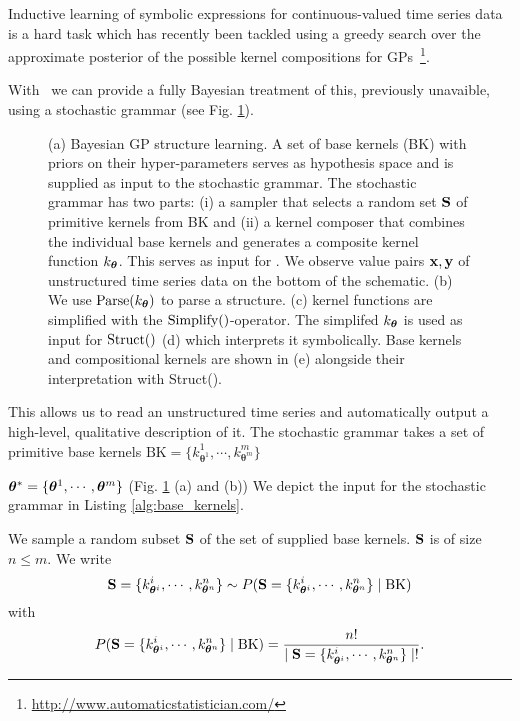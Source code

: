 Inductive learning of symbolic expressions for continuous-valued time series
data is a hard task which has recently been tackled using a greedy search over 
the approximate posterior of the possible kernel compositions for
\ac{GP}s~\citep{duvenaud2013structure,lloyd2014automatic}\footnote{\url{http://www.automaticstatistician.com/}}.

With \gpmem\ we can provide a fully Bayesian treatment of this, previously unavaible,
using a stochastic grammar  (see Fig. \ref{fig:schema}).
\begin{figure}
\centering

\caption{\footnotesize (a) Bayesian GP structure learning. A set of
base kernels (BK) with priors on their hyper-parameters serves as hypothesis space
and is supplied as input to the stochastic grammar. The stochastic grammar has
two parts: (i) a sampler that selects a random set $\mathbf{S}$  of primitive kernels from BK
and (ii) a kernel composer that combines the individual base kernels and generates
a composite kernel function
$k_{\bm{\theta}}$. This serves as input for
\gpmem.  We observe value pairs $\mathbf{x},\mathbf{y}$ of unstructured time series data on
the bottom of the schematic.
(b) We use $\text{Parse}(k_{\bm{\theta}})$ to parse a structure. (c) kernel functions are
simplified with the $\text{Simplify}()$-operator. The simplifed $k_{\bm{\theta}}$ is used as input for
$\text{Struct}()$ (d) which  interprets it symbolically.
Base kernels and compositional kernels are shown in (e) alongside their
interpretation with Struct().}\label{fig:schema}
\end{figure}
This allows us to read an unstructured time series and automatically output a high-level,
qualitative description of it. The stochastic grammar takes a set of primitive base kernels 
    $\text{BK}=\{k_{\bm{\theta}^1}^1,\cdots,k_{\bm{\theta}^m}^m\}$

    $\bm{\theta}^*=\{\bm{\theta}^1,\cdots,\bm{\theta}^m\}$ (Fig. \ref{fig:schema} (a) and (b))
We depict the input for the
stochastic grammar in Listing \ref{alg:base_kernels}.

We sample a random subset $\mathbf{S}$ of
the set of supplied base kernels. $\mathbf{S}$ is of size $n \leq m$. We write
\[
\mathbf{S} = \{k_{\bm{\theta}^i}^i,\cdots,k_{\bm{\theta}^n}^n\}
\sim P(\mathbf{S} = \{k_{\bm{\theta}^i}^i,\cdots,k_{\bm{\theta}^n}^n\} \mid
\text{BK}) 
\]
with
\[
P(\mathbf{S} = \{k_{\bm{\theta}^i}^i,\cdots,k_{\bm{\theta}^n}^n\}\mid \text{BK}) =
\frac{n!}{ \mid \mathbf{S} = \{k_{\bm{\theta}^i}^i,\cdots,k_{\bm{\theta}^n}^n\}\mid !}.
\]

